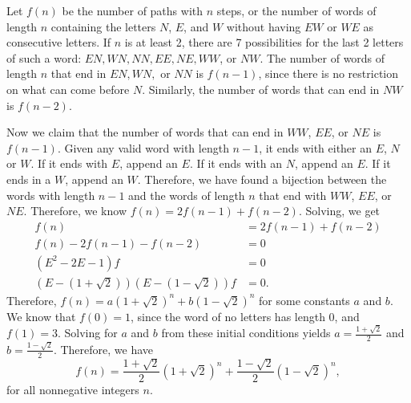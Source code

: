 \documentclass[11pt]{article}
\begin{document}
Let $f(n)$ be the number of paths with $n$ steps, or the number of words of length $n$ containing the letters $N$, $E$, and $W$ without having $EW$ or $WE$ as consecutive letters. If $n$ is at least 2, there are 7 possibilities for the last 2 letters of such a word: $EN,WN,NN,EE,NE,WW$, or $NW$. The number of words of length $n$ that end in $EN,WN,$ or $NN$ is $f(n-1)$, since there is no restriction on what can come before $N$. Similarly, the number of words that can end in $NW$ is $f(n-2)$.

Now we claim that the number of words that can end in $WW$, $EE$, or $NE$ is $f(n-1)$. Given any valid word with length $n-1$, it ends with either an $E$, $N$ or $W$. If it ends with $E$, append an $E$. If it ends with an $N$, append an $E$. If it ends in a $W$, append an $W$. Therefore, we have found a bijection between the words with length $n-1$ and the words of length $n$ that end with $WW$, $EE$, or $NE$. Therefore, we know $f(n)=2f(n-1)+f(n-2)$. Solving, we get
\begin{align*}
f(n)&=2f(n-1)+f(n-2)\\
f(n)-2f(n-1)-f(n-2)&=0\\
(E^2-2E-1)f&=0\\
(E-(1+\sqrt{2}))(E-(1-\sqrt{2}))f&=0.
\end{align*}
Therefore, $f(n)=a(1+\sqrt{2})^{n}+b(1-\sqrt{2})^{n}$ for some constants $a$ and $b$. We know that $f(0)=1$, since the word of no letters has length 0, and $f(1)=3$. Solving for $a$ and $b$ from these initial conditions yields $a=\frac{1+\sqrt{2}}{2}$ and $b=\frac{1-\sqrt{2}}{2}$. Therefore, we have
\begin{equation*}
f(n)=\frac{1+\sqrt{2}}{2}(1+\sqrt{2})^{n}+\frac{1-\sqrt{2}}{2}(1-\sqrt{2})^{n},
\end{equation*}
for all nonnegative integers $n$. 
\end{document}
